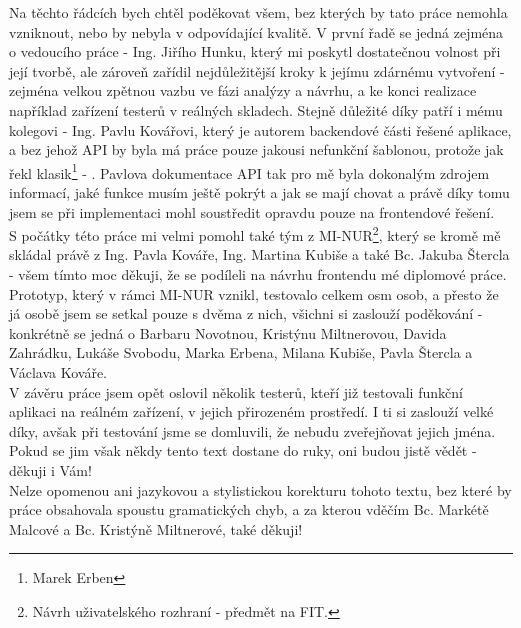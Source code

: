 Na těchto řádcích bych chtěl poděkovat všem, bez kterých by tato práce nemohla vzniknout, nebo by nebyla v odpovídající kvalitě. V první řadě se jedná zejména o vedoucího práce - Ing. Jiřího Hunku, který mi poskytl dostatečnou volnost při její tvorbě, ale zároveň zařídil nejdůležitější kroky k jejímu zdárnému vytvoření - zejména velkou zpětnou vazbu ve fázi analýzy a návrhu, a ke konci realizace například zařízení testerů v reálných skladech. Stejně důležité díky patří i mému kolegovi - Ing. Pavlu Kovářovi, který je autorem backendové části řešené aplikace, a bez jehož API by byla má práce pouze jakousi nefunkční šablonou, protože jak řekl klasik\footnote{Marek Erben} - . Pavlova dokumentace API tak pro mě byla dokonalým zdrojem informací, jaké funkce musím ještě pokrýt a jak se mají chovat a právě díky tomu jsem se při implementaci mohl soustředit opravdu pouze na frontendové řešení.\\
S počátky této práce mi velmi pomohl také tým z MI-NUR\footnote{Návrh uživatelského rozhraní - předmět na FIT.}, který se kromě mě skládal právě z Ing. Pavla Kováře, Ing. Martina Kubiše a také Bc. Jakuba Štercla - všem tímto moc děkuji, že se podíleli na návrhu frontendu mé diplomové práce. Prototyp, který v rámci MI-NUR vznikl, testovalo celkem osm osob, a přesto že já osobě jsem se setkal pouze s dvěma z nich, všichni si zaslouží poděkování - konkrétně se jedná o Barbaru Novotnou, Kristýnu Miltnerovou, Davida Zahrádku, Lukáše Svobodu, Marka Erbena, Milana Kubiše, Pavla Štercla a Václava Kováře.\\
V závěru práce jsem opět oslovil několik testerů, kteří již testovali funkční aplikaci na reálném zařízení, v jejich přirozeném prostředí. I ti si zaslouží velké díky, avšak při testování jsme se domluvili, že nebudu zveřejňovat jejich jména. Pokud se jim však někdy tento text dostane do ruky, oni budou jistě vědět - děkuji i Vám!\\
Nelze opomenou ani jazykovou a stylistickou korekturu tohoto textu, bez které by práce obsahovala spoustu gramatických chyb, a za kterou vděčím Bc. Markétě Malcové a Bc. Kristýně Miltnerové, také děkuji!
